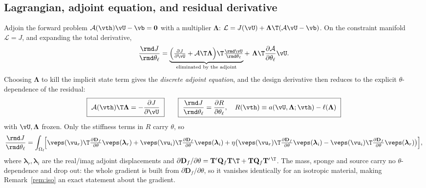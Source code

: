 \subsection{Lagrangian, adjoint equation, and residual derivative}
Adjoin the forward problem $\mathcal A(\vth)\vU-\vb=\mathbf0$ with a multiplier
$\bm\Lambda$: $\mathcal L=J(\vU)+\bm\Lambda\T(\mathcal A\vU-\vb)$. On the
constraint manifold $\mathcal L=J$, and expanding the total derivative,
\begin{equation}
  \frac{\rmd J}{\rmd\theta_\ell}
  =\underbrace{\Bigl(\tfrac{\partial J}{\partial\vU}
  +\mathcal A\T\bm\Lambda\Bigr)\T\tfrac{\rmd\vU}{\rmd\theta_\ell}}
  _{\text{eliminated by the adjoint}}
  +\ \bm\Lambda\T\frac{\partial\mathcal A}{\partial\theta_\ell}\vU .
\end{equation}
Choosing $\bm\Lambda$ to kill the implicit state term gives the \emph{discrete
adjoint equation}, and the design derivative then reduces to the explicit
$\theta$-dependence of the residual:
\begin{equation}
  \boxed{\ \mathcal A(\vth)\T\bm\Lambda=-\frac{\partial J}{\partial\vU}\ }
  \qquad
  \boxed{\ \frac{\rmd J}{\rmd\theta_\ell}=\frac{\partial R}{\partial\theta_\ell},
  \quad R(\vth)\equiv a(\vU,\bm\Lambda;\vth)-\ell(\bm\Lambda)\ }
  \label{eq:adj}
\end{equation}
with $\vU,\bm\Lambda$ frozen. Only the stiffness terms in $R$ carry $\theta$, so
\begin{equation}
  \frac{\rmd J}{\rmd\theta_\ell}
  =\int_{\Omega_\ell}\!\Bigl[\veps(\vu_r)\T
  \tfrac{\partial\mathbf D_f}{\partial\theta}\veps(\bm\lambda_r)
  +\veps(\vu_i)\T\tfrac{\partial\mathbf D_f}{\partial\theta}\veps(\bm\lambda_i)
  +\eta\bigl(\veps(\vu_r)\T\tfrac{\partial\mathbf D_f}{\partial\theta}
  \veps(\bm\lambda_i)-\veps(\vu_i)\T\tfrac{\partial\mathbf D_f}{\partial\theta}
  \veps(\bm\lambda_r)\bigr)\Bigr],
  \label{eq:sens}
\end{equation}
where $\bm\lambda_r,\bm\lambda_i$ are the real/imag adjoint displacements and
$\partial\mathbf D_f/\partial\theta=\mathbf T'\mathbf Q_f\mathbf T\T+\mathbf T
\mathbf Q_f\mathbf T'^{\,\T}$. The mass, sponge and source carry no
$\theta$-dependence and drop out: the whole gradient is built from
$\partial\mathbf D_f/\partial\theta$, so it vanishes identically for an isotropic
material, making Remark~\ref{rem:iso} an exact statement about the gradient.

